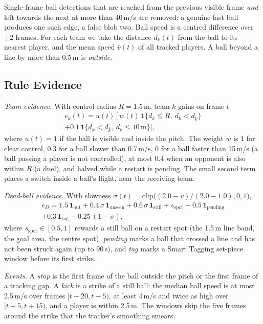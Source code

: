 \documentclass[conference]{IEEEtran}
\begin{document}
Single-frame ball detections that are reached from the previous visible frame \emph{and} left towards the next at
more than 40\,m/s are removed: a genuine fast ball produces one such edge, a false blob two. Ball speed is a centred
difference over $\pm2$ frames. For each team we take the distance $d_k(t)$ from the ball to its nearest player, and
the mean speed $\bar v(t)$ of all tracked players. A ball beyond a line by more than 0.5\,m is \emph{outside}.

\subsection{Rule Evidence}

\emph{Team evidence.} With control radius $R=1.5$\,m, team $k$ gains on frame $t$
\begin{multline}
e_k(t) = u(t)\,\big[\,w(t)\,\mathbf{1}\{d_k\le R,\ d_k<d_{\bar k}\}\\
+ 0.1\,\mathbf{1}\{d_k<d_{\bar k},\ d_k\le 10\,\text{m}\}\big],
\end{multline}
where $u(t)=1$ if the ball is visible and inside the pitch. The weight $w$ is 1 for clear control, 0.3 for a ball
slower than 0.7\,m/s, 0 for a ball faster than 15\,m/s (a ball passing a player is not controlled), at most 0.4 when
an opponent is also within $R$ (a duel), and halved while a restart is pending. The small second term places a switch
inside a ball's flight, near the receiving team.

\emph{Dead-ball evidence.} With slowness $\sigma(t)=\mathrm{clip}\big((2.0-\bar v)/(2.0-1.0),0,1\big)$,
\begin{multline}
e_D = 1.5\,\mathbf{1}_{\text{out}} + 0.4\,\sigma\,\mathbf{1}_{\text{unseen}} + 0.6\,\sigma\,\mathbf{1}_{\text{still}}
+ s_{\text{spot}} + 0.5\,\mathbf{1}_{\text{pending}}\\ + 0.3\,\mathbf{1}_{\text{tag}} - 0.25\,(1-\sigma),
\end{multline}
where $s_{\text{spot}}\in[0.5,1]$ rewards a still ball on a restart spot (the 1.5\,m line band, the goal area, the
centre spot), \emph{pending} marks a ball that crossed a line and has not been struck again (up to 90\,s), and
\emph{tag} marks a Smart Tagging set-piece window before its first strike.

\emph{Events.} A \emph{stop} is the first frame of the ball outside the pitch or the first frame of a tracking gap. A
\emph{kick} is a strike of a still ball: the median ball speed is at most 2.5\,m/s over frames $[t-20,t-5)$, at least
4\,m/s and twice as high over $[t+5,t+15)$, and a player is within 2.5\,m. The windows skip the five frames around
the strike that the tracker's smoothing smears.
\end{document}
